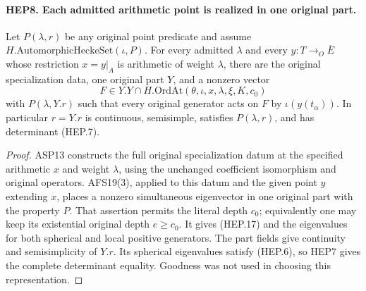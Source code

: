 \paragraph{HEP8. Each admitted arithmetic point is realized in one original part.}
\label{claim:HEP8}
Let $P(\lambda,r)$ be any original point predicate and assume
$H.\mathrm{AutomorphicHeckeSet}(\iota,P)$.
For every admitted $\lambda$ and every $y:T\to_O\overline E$
whose restriction $x=y|_A$ is arithmetic of weight $\lambda$,
there are the original specialization data, one original part $Y$,
and a nonzero vector
\[
 F\in Y.Y\cap H.\mathrm{OrdAt}
                   (\theta,\iota,x,\lambda,\xi,K,c_0)
 \tag{HEP.17}
\]
with $P(\lambda,Y.r)$ such that every original generator acts on
$F$ by $\iota(y(t_\alpha))$.  In particular $r=Y.r$ is continuous,
semisimple, satisfies $P(\lambda,r)$, and has determinant (HEP.7).
\begin{proof}
ASP13 constructs the full original specialization datum at the
specified arithmetic $x$ and weight $\lambda$, using the unchanged
coefficient isomorphism and original operators.  AFS19(3), applied
to this datum and the given point $y$ extending $x$, places a
nonzero simultaneous eigenvector in one original part with the
property $P$.  That assertion permits the literal depth $c_0$;
equivalently one may keep its existential original depth $e\geq c_0$.
It gives (HEP.17) and the eigenvalues for both spherical and local
positive generators.  The part fields give continuity and
semisimplicity of $Y.r$.  Its spherical eigenvalues satisfy (HEP.6),
so HEP7 gives the complete determinant equality.  Goodness was
not used in choosing this representation.
\end{proof}

